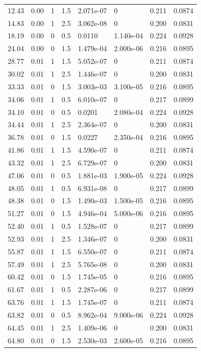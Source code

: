 \documentclass[preview]{standalone}
\begin{document}
{{\begin{tabular}{L{1.2cm}C{1.2cm} C{0.3cm}C{0.5cm} C{1.4cm}C{1.4cm} C{1.4cm}C{1.4cm}}
  12.43  &  0.00  & 1     & 1.5 &  2.071e-07  & 0  & 0.211 &  0.0874   \\ 
  14.83  &  0.00  & 1     & 2.5 &  3.062e-08  & 0  & 0.200 &  0.0831   \\ 
  18.19  &  0.00  & 0     & 0.5 &  0.0110  & 1.140e-04  & 0.224 &  0.0928   \\ 
  24.04  &  0.00  & 0     & 1.5 &  1.479e-04  & 2.000e-06  & 0.216 &  0.0895   \\ 
  28.77  &  0.01  & 1     & 1.5 &  5.052e-07  & 0  & 0.211 &  0.0874   \\ 
  30.02  &  0.01  & 1     & 2.5 &  1.446e-07  & 0  & 0.200 &  0.0831   \\ 
  33.33  &  0.01  & 0     & 1.5 &  3.003e-03  & 3.100e-05  & 0.216 &  0.0895   \\ 
  34.06  &  0.01  & 1     & 0.5 &  6.010e-07  & 0  & 0.217 &  0.0899   \\ 
  34.10  &  0.01  & 0     & 0.5 &  0.0201  & 2.080e-04  & 0.224 &  0.0928   \\ 
  34.44  &  0.01  & 1     & 2.5 &  2.364e-07  & 0  & 0.200 &  0.0831   \\ 
  36.78  &  0.01  & 0     & 1.5 &  0.0227  & 2.350e-04  & 0.216 &  0.0895   \\ 
  41.86  &  0.01  & 1     & 1.5 &  4.590e-07  & 0  & 0.211 &  0.0874   \\ 
  43.32  &  0.01  & 1     & 2.5 &  6.729e-07  & 0  & 0.200 &  0.0831   \\ 
  47.06  &  0.01  & 0     & 0.5 &  1.881e-03  & 1.900e-05  & 0.224 &  0.0928   \\ 
  48.05  &  0.01  & 1     & 0.5 &  6.931e-08  & 0  & 0.217 &  0.0899   \\ 
  48.38  &  0.01  & 0     & 1.5 &  1.490e-03  & 1.500e-05  & 0.216 &  0.0895   \\ 
  51.27  &  0.01  & 0     & 1.5 &  4.946e-04  & 5.000e-06  & 0.216 &  0.0895   \\ 
  52.40  &  0.01  & 1     & 0.5 &  1.528e-07  & 0  & 0.217 &  0.0899   \\ 
  52.93  &  0.01  & 1     & 2.5 &  1.346e-07  & 0  & 0.200 &  0.0831   \\ 
  55.87  &  0.01  & 1     & 1.5 &  6.550e-07  & 0  & 0.211 &  0.0874   \\ 
  57.49  &  0.01  & 1     & 2.5 &  5.765e-08  & 0  & 0.200 &  0.0831   \\ 
  60.42  &  0.01  & 0     & 1.5 &  1.745e-05  & 0  & 0.216 &  0.0895   \\ 
  61.67  &  0.01  & 1     & 0.5 &  2.287e-06  & 0  & 0.217 &  0.0899   \\ 
  63.76  &  0.01  & 1     & 1.5 &  1.745e-07  & 0  & 0.211 &  0.0874   \\ 
  63.82  &  0.01  & 0     & 0.5 &  8.962e-04  & 9.000e-06  & 0.224 &  0.0928   \\ 
  64.45  &  0.01  & 1     & 2.5 &  1.409e-06  & 0  & 0.200 &  0.0831   \\ 
  64.80  &  0.01  & 0     & 1.5 &  2.530e-03  & 2.600e-05  & 0.216 &  0.0895   \\ 
\hline 
\end{tabular} 

}}
\end{document}
